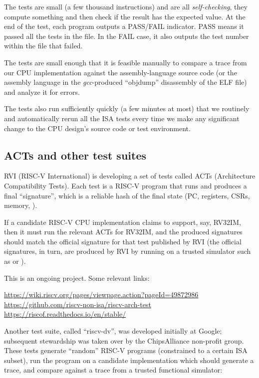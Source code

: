 The tests are small (a few thousand instructions) and are all
\emph{self-checking}, {\ie} they compute something and then check if
the result has the expected value.  At the end of the test, each
program outputs a PASS/FAIL indicator.  PASS means it passed all the
tests in the file. In the FAIL case, it also outputs the test number
within the file that failed.

The tests are small enough that it is feasible manually to compare a
trace from our CPU implementation against the assembly-language source
code (or the assembly language in the \emph{gcc}-produced ``objdump''
disassembly of the ELF file) and analyze it for errors.

The tests also run sufficiently quickly (a few minutes at most) that
we routinely and automatically rerun all the ISA tests every time we
make any significant change to the CPU design's source code or test
environment.


\subsection{ACTs and other test suites}

RVI (RISC-V International) is developing a set of tests called ACTs
(Architecture Compatibility Tests).  Each test is a RISC-V program
that runs and produces a final ``signature'', which is a reliable hash
of the final state (PC, registers, CSRs, memory, {\etc}).

If a candidate RISC-V CPU implementation claims to support, say,
RV32IM, then it must run the relevant ACTs for RV32IM, and the
produced signatures should match the official signature for that test
published by RVI (the official signatures, in turn, are produced by
RVI by running on a trusted simulator such as {\SPIKE} or {\SAIL}).

This is an ongoing project. Some relevant links:

\begin{tabbing}
\hmm \= \url{https://wiki.riscv.org/pages/viewpage.action?pageId=49872986} \\
     \> \url{https://github.com/riscv-non-isa/riscv-arch-test} \\
     \> \url{https://riscof.readthedocs.io/en/stable/}
\end{tabbing}

Another test suite, called ``riscv-dv'', was developed initially at
Google; subsequent stewardship was taken over by the ChipsAlliance
non-profit group.  These tests generate ``random'' RISC-V programs
(constrained to a certain ISA subset), run the program on a candidate
implementation which should generate a trace, and compare against a
trace from a trusted functional simulator:


